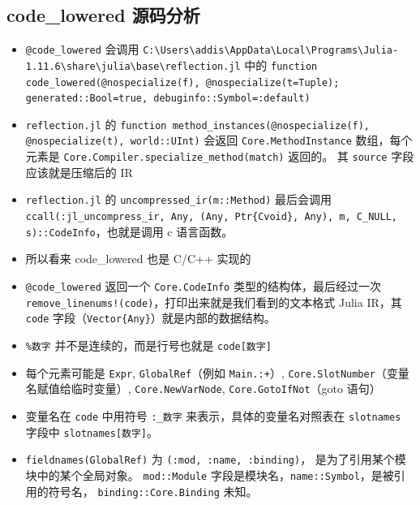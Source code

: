 \subsection{code_lowered 源码分析}
\begin{itemize}
\item \verb`@code_lowered` 会调用 \verb`C:\Users\addis\AppData\Local\Programs\Julia-1.11.6\share\julia\base\reflection.jl` 中的 \verb`function code_lowered(@nospecialize(f), @nospecialize(t=Tuple); generated::Bool=true, debuginfo::Symbol=:default)`
\item \verb`reflection.jl` 的 \verb`function method_instances(@nospecialize(f), @nospecialize(t), world::UInt)` 会返回 \verb`Core.MethodInstance` 数组，每个元素是 \verb`Core.Compiler.specialize_method(match)` 返回的。 其 \verb`source` 字段应该就是压缩后的 IR
\item \verb`reflection.jl` 的 \verb`uncompressed_ir(m::Method)` 最后会调用 \verb`ccall(:jl_uncompress_ir, Any, (Any, Ptr{Cvoid}, Any), m, C_NULL, s)::CodeInfo`，也就是调用 c 语言函数。
\item 所以看来 code_lowered 也是 C/C++ 实现的
\item \verb`@code_lowered` 返回一个 \verb`Core.CodeInfo` 类型的结构体，最后经过一次 \verb`remove_linenums!(code)`，打印出来就是我们看到的文本格式 Julia IR，其 \verb`code` 字段（\verb`Vector{Any}`）就是内部的数据结构。
\item \verb`%数字` 并不是连续的，而是行号也就是 \verb`code[数字]`
\item 每个元素可能是 \verb`Expr`, \verb`GlobalRef`（例如 \verb`Main.:+`）, \verb`Core.SlotNumber`（变量名赋值给临时变量）, \verb`Core.NewVarNode`, \verb`Core.GotoIfNot`（goto 语句）
\item 变量名在 \verb`code` 中用符号 \verb`:_数字` 来表示，具体的变量名对照表在 \verb`slotnames` 字段中 \verb`slotnames[数字]`。
\item \verb`fieldnames(GlobalRef)` 为 \verb`(:mod, :name, :binding)`， 是为了引用某个模块中的某个全局对象。 \verb`mod::Module` 字段是模块名，\verb`name::Symbol`，是被引用的符号名， \verb`binding::Core.Binding` 未知。
\end{itemize}

